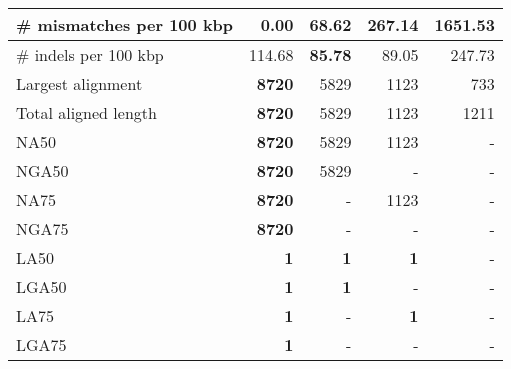\documentclass[12pt,a4paper]{article}
\begin{document}
\begin{table}[ht]
\begin{center}
\begin{tabular}{|l*{4}{|r}|}
\# mismatches per 100 kbp & {\bf 0.00} & 68.62 & 267.14 & 1651.53 \\ \hline
\# indels per 100 kbp & 114.68 & {\bf 85.78} & 89.05 & 247.73 \\ \hline
Largest alignment & {\bf 8720} & 5829 & 1123 & 733 \\ \hline
Total aligned length & {\bf 8720} & 5829 & 1123 & 1211 \\ \hline
NA50 & {\bf 8720} & 5829 & 1123 & - \\ \hline
NGA50 & {\bf 8720} & 5829 & - & - \\ \hline
NA75 & {\bf 8720} & - & 1123 & - \\ \hline
NGA75 & {\bf 8720} & - & - & - \\ \hline
LA50 & {\bf 1} & {\bf 1} & {\bf 1} & - \\ \hline
LGA50 & {\bf 1} & {\bf 1} & - & - \\ \hline
LA75 & {\bf 1} & - & {\bf 1} & - \\ \hline
LGA75 & {\bf 1} & - & - & - \\ \hline
\end{tabular}
\end{center}
\end{table}
\end{document}
